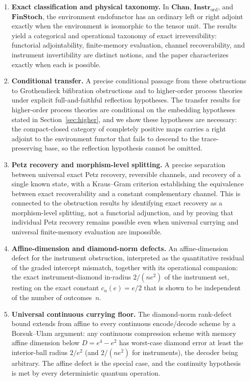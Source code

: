 \documentclass[11pt]{article}
\begin{document}
\begin{enumerate}[label=\arabic*., leftmargin=*]
\item \textbf{Exact classification and physical taxonomy.}
In $\mathbf{Chan}$, $\mathbf{Instr}_{\mathrm{ord}}$, and
$\mathbf{FinStoch}$, the environment endofunctor has an ordinary left or
right adjoint exactly when the environment is isomorphic to the tensor unit.
The results yield a categorical and operational taxonomy of exact
irreversibility: functorial adjointability, finite-memory evaluation, channel
recoverability, and instrument invertibility are distinct notions, and the
paper characterizes exactly when each is possible.

\item \textbf{Conditional transfer.}
A precise conditional passage from these obstructions to Grothendieck
bifibration obstructions and to higher-order process theories under explicit
full-and-faithful reflection hypotheses. The transfer results for
higher-order process theories are conditional on the embedding hypotheses
stated in Section~\ref{sec:higher}, and we show these hypotheses are
necessary: the compact-closed category of completely positive maps carries a
right adjoint to the environment functor that fails to descend to the
trace-preserving base, so the reflection hypothesis cannot be omitted.

\item \textbf{Petz recovery and morphism-level splitting.}
A precise separation between universal exact Petz recovery, reversible
channels, and recovery of a single known state, with a Kraus--Gram criterion
establishing the equivalence between exact recoverability and a constant
complementary channel. This is connected to the obstruction results by
identifying exact recovery as a morphism-level splitting, not a functorial
adjunction, and by proving that individual Petz recovery remains possible
even when universal currying and universal finite-memory evaluation are
impossible.

\item \textbf{Affine-dimension and diamond-norm defects.}
An affine-dimension defect for the instrument obstruction,
interpreted as the quantitative residual of the graded intercept mismatch,
together with its operational companion: the exact instrument-diamond in-radius
$2/(ne^2)$ of the instrument set, resting on the exact constant
$c_n(e)=e/2$ that is shown to be independent of the number of outcomes~$n$.

\item \textbf{Universal continuous currying floor.}
The diamond-norm rank-defect bound extends from affine to every continuous
encode/decode scheme by a Borsuk--Ulam argument: any continuous compression
scheme with memory affine dimension below $D=e^4-e^2$ has worst-case diamond
error at least the interior-ball radius $2/e^2$ (and $2/(ne^2)$ for instruments),
the decoder being arbitrary. The affine defect is the special case, and the
continuity hypothesis is met by every deterministic quantum operation.

\end{enumerate}
\end{document}
